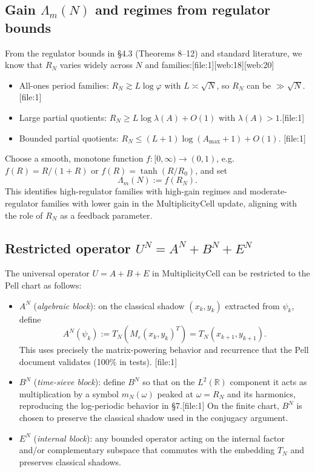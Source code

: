\documentclass[11pt]{article}
\begin{document}
\subsection{Gain \texorpdfstring{\(\Lambda_m(N)\)}{} and regimes from regulator bounds}

From the regulator bounds in §4.3 (Theorems 8–12) and standard
literature, we know that \(R_N\) varies widely across \(N\) and families:[file:1][web:18][web:20]

\begin{itemize}
  \item All-ones period families: \(R_N \gtrsim L \log\varphi\) with
        \(L\asymp\sqrt{N}\), so \(R_N\) can be \(\gg\sqrt{N}\).[file:1]
  \item Large partial quotients: \(R_N \ge L \log\lambda(A) + O(1)\) with
        \(\lambda(A) > 1\).[file:1]
  \item Bounded partial quotients: \(R_N \le (L+1)\log(A_{\max}+1) + O(1)\).%
        [file:1]
\end{itemize}

Choose a smooth, monotone function
\(f: [0,\infty)\to(0,1)\), e.g.\ \(f(R) = R/(1+R)\) or
\(f(R) = \tanh(R/R_0)\), and set
\[
\Lambda_m(N) := f(R_N).
\]
This identifies high-regulator families with high-gain regimes and
moderate-regulator families with lower gain in the MultiplicityCell
update, aligning with the role of \(R_N\) as a feedback parameter.

\subsection{Restricted operator \texorpdfstring{\(U^N = A^N + B^N + E^N\)}{}}

The universal operator \(U = A + B + E\) in MultiplicityCell can be
restricted to the Pell chart as follows:

\begin{itemize}
  \item \(A^N\) (\emph{algebraic block}): on the classical shadow
        \((x_k,y_k)\) extracted from \(\psi_k\), define
        \[
        A^N(\psi_k) := T_N(M_\varepsilon (x_k,y_k)^T)
        = T_N(x_{k+1}, y_{k+1}).
        \]
        This uses precisely the matrix-powering behavior and recurrence
        that the Pell document validates (100\% in tests).%
        [file:1]
  \item \(B^N\) (\emph{time-sieve block}): define \(B^N\) so that on the
        \(L^2(\mathbb{R})\) component it acts as multiplication by a
        symbol \(m_N(\omega)\) peaked at \(\omega=R_N\) and its
        harmonics, reproducing the log-periodic behavior in §7.[file:1]
        On the finite chart, \(B^N\) is chosen to preserve the classical
        shadow used in the conjugacy argument.
  \item \(E^N\) (\emph{internal block}): any bounded operator acting on
        the internal factor and/or complementary subspace that commutes
        with the embedding \(T_N\) and preserves classical shadows.
\end{itemize}
\end{document}

